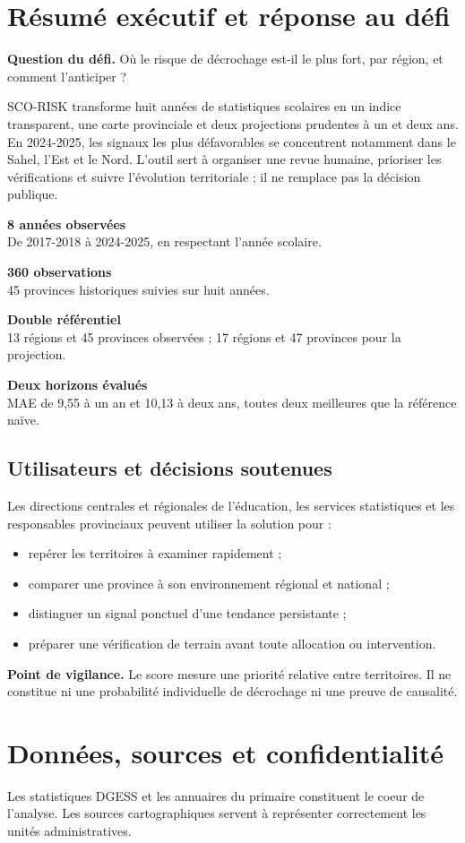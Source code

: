 \documentclass[12pt,a4paper]{article}
\newcommand{\keybox}[2]{%
  \begin{minipage}[t]{0.48\linewidth}
  \colorbox{Pale}{\parbox{0.92\linewidth}{\vspace{2mm}\textbf{\color{Blue}#1}\\[-1mm]{\small #2}\vspace{2mm}}}
  \end{minipage}}
\newcommand{\note}[1]{\colorbox{SoftOrange}{\parbox{0.96\linewidth}{\textbf{\color{Orange}Point de vigilance.} #1}}}
\begin{document}
\section{Résumé exécutif et réponse au défi}
\textbf{Question du défi.} Où le risque de décrochage est-il le plus fort, par région, et comment l'anticiper ?

SCO-RISK transforme huit années de statistiques scolaires en un indice transparent, une carte provinciale et deux projections prudentes à un et deux ans. En 2024-2025, les signaux les plus défavorables se concentrent notamment dans le Sahel, l'Est et le Nord. L'outil sert à organiser une revue humaine, prioriser les vérifications et suivre l'évolution territoriale ; il ne remplace pas la décision publique.

\vspace{4mm}
\keybox{8 années observées}{De 2017-2018 à 2024-2025, en respectant l'année scolaire.}\hfill
\keybox{360 observations}{45 provinces historiques suivies sur huit années.}

\vspace{3mm}
\keybox{Double référentiel}{13 régions et 45 provinces observées ; 17 régions et 47 provinces pour la projection.}\hfill
\keybox{Deux horizons évalués}{MAE de 9,55 à un an et 10,13 à deux ans, toutes deux meilleures que la référence naïve.}

\subsection{Utilisateurs et décisions soutenues}
Les directions centrales et régionales de l'éducation, les services statistiques et les responsables provinciaux peuvent utiliser la solution pour :
\begin{itemize}
  \item repérer les territoires à examiner rapidement ;
  \item comparer une province à son environnement régional et national ;
  \item distinguer un signal ponctuel d'une tendance persistante ;
  \item préparer une vérification de terrain avant toute allocation ou intervention.
\end{itemize}

\note{Le score mesure une priorité relative entre territoires. Il ne constitue ni une probabilité individuelle de décrochage ni une preuve de causalité.}
\clearpage

\section{Données, sources et confidentialité}
Les statistiques DGESS et les annuaires du primaire constituent le coeur de l'analyse. Les sources cartographiques servent à représenter correctement les unités administratives.
\end{document}
